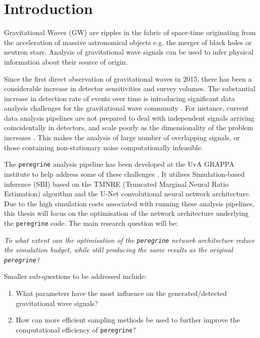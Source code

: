 \section{Introduction}
\label{sec:introduction}

Gravitational Waves (GW) are ripples in the fabric of space-time originating from the acceleration of massive astronomical objects e.g. the merger of black holes or neutron stars. Analysis of gravitational wave signals can be used to infer physical information about their source of origin. 

Since the first direct observation of gravitational waves in 2015, there has been a considerable increase in detector sensitivities and survey volumes. The substantial increase in detection rate of events over time is introducing significant data analysis challenges for the gravitational wave community \cite{bhardwaj2023peregrine}.
For instance, current data analysis pipelines are not prepared to deal with independent signals arriving coincidentally in detectors, and scale poorly as the dimensionality of the problem increases \cite{alvey2023things}. This makes the analysis of large number of overlapping signals, or those containing non-stationary noise computationally infeasible.

The \texttt{peregrine} analysis pipeline has been developed at the UvA GRAPPA institute to help address some of these challenges \cite{bhardwaj2023peregrine}. It utilises Simulation-based inference (SBI) based on the TMNRE (Truncated Marginal Neural Ratio Estimation) algorithm and the U-Net convolutional neural network architecture. Due to the high simulation costs associated with running these analysis pipelines, this thesis will focus on the optimisation of the network architecture underlying the \texttt{peregrine} code. The main research question will be: 

\textit{To what extent can the optimisation of the \texttt{peregrine} network architecture reduce the simulation budget, while still producing the same results as the original \texttt{peregrine}?}

Smaller sub-questions to be addressed include:

\begin{enumerate}
    \item What parameters have the most influence on the generated/detected gravitational wave signals?
    \item How can more efficient sampling methods be used to further improve the computational efficiency of \texttt{peregrine}?
\end{enumerate}
